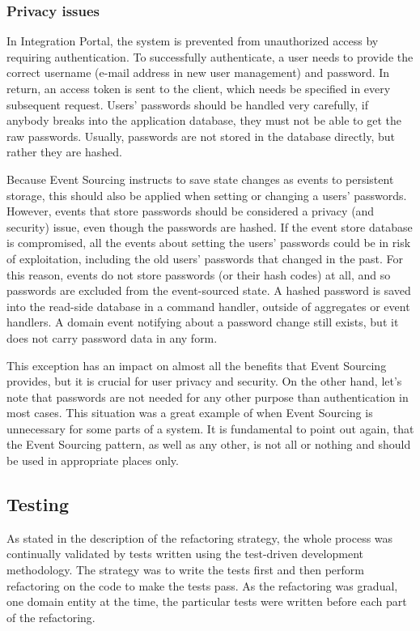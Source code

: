 \documentclass{book}
\begin{document}
\subsubsection{Privacy issues}\label{privacy-issues}

In Integration Portal, the system is prevented from unauthorized access
by requiring authentication. To successfully authenticate, a user needs
to provide the correct username (e-mail address in new user management)
and password. In return, an access token is sent to the client, which
needs be specified in every subsequent request. Users' passwords should
be handled very carefully, if anybody breaks into the application
database, they must not be able to get the raw passwords. Usually,
passwords are not stored in the database directly, but rather they are
hashed.

Because Event Sourcing instructs to save state changes as events to
persistent storage, this should also be applied when setting or changing
a users' passwords. However, events that store passwords should be
considered a privacy (and security) issue, even though the passwords are
hashed. If the event store database is compromised, all the events about
setting the users' passwords could be in risk of exploitation, including
the old users' passwords that changed in the past. For this reason,
events do not store passwords (or their hash codes) at all, and so
passwords are excluded from the event-sourced state. A hashed password
is saved into the read-side database in a command handler, outside of
aggregates or event handlers. A domain event notifying about a password
change still exists, but it does not carry password data in any form.

This exception has an impact on almost all the benefits that Event
Sourcing provides, but it is crucial for user privacy and security. On
the other hand, let's note that passwords are not needed for any other
purpose than authentication in most cases. This situation was a great
example of when Event Sourcing is unnecessary for some parts of a
system. It is fundamental to point out again, that the Event Sourcing
pattern, as well as any other, is not all or nothing and should be used
in appropriate places only.


\subsection{Testing}\label{testing}

As stated in the description of the refactoring strategy, the whole
process was continually validated by tests written using the test-driven
development methodology. The strategy was to write the tests first and
then perform refactoring on the code to make the tests pass. As the
refactoring was gradual, one domain entity at the time, the particular
tests were written before each part of the refactoring.
\end{document}
